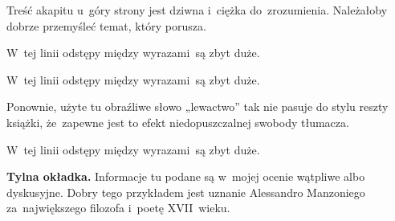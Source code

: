 \documentclass[a4paper,11pt]{article}
\begin{document}
\vspace{\spaceFour}


\start {} Treść akapitu u~góry strony jest dziwna i~ciężka
do~zrozumienia. Należałoby dobrze przemyśleć temat, który porusza.

\vspace{\spaceFour}


\start {} W~tej linii odstępy między wyrazami~są zbyt
duże.

\vspace{\spaceFour}


\start {} W~tej linii odstępy między wyrazami~są zbyt
duże.

\vspace{\spaceFour}


\start {} Ponownie, użyte tu obraźliwe słowo „lewactwo”
tak nie pasuje do stylu reszty książki, że~zapewne jest to efekt
niedopuszczalnej swobody tłumacza.

\vspace{\spaceFour}


\start {} W~tej linii odstępy między wyrazami~są zbyt
duże.

\vspace{\spaceFour}


\start \textbf{Tylna okładka.} Informacje tu podane są w~mojej ocenie
wątpliwe albo dyskusyjne. Dobry tego przykładem jest uznanie
Alessandro Manzoniego za~największego filozofa i~poetę XVII~wieku.

\vspace{\spaceFour}





\end{document}
